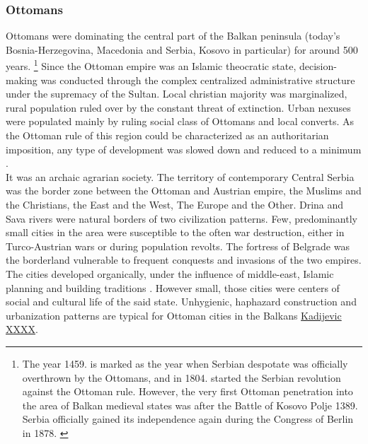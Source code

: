 \documentclass[11pt]{report}
\begin{document}
\subsubsection{Ottomans}

Ottomans were dominating the central part of the Balkan peninsula (today’s Bosnia-Herzegovina,  Macedonia  and  Serbia,  Kosovo  in  particular) for around 500 years.
\footnote{The year 1459. is marked as the year when Serbian despotate was officially overthrown by the Ottomans, and in 1804. started the Serbian revolution against the Ottoman rule. However, the very first Ottoman penetration into the area of Balkan medieval  states was after the Battle of Kosovo Polje 1389. Serbia officially gained its independence again during the Congress of Berlin in 1878. \href{ref}{\citealt{corovic_istorija_1997}}}
Since the Ottoman empire was an Islamic theocratic state, decision-making was conducted through the complex centralized administrative structure under the supremacy of the Sultan. Local christian majority was marginalized, rural population ruled over by the constant threat of extinction. Urban nexuses were populated mainly by ruling social class of Ottomans and local converts. As the Ottoman rule of this region could be characterized as an authoritarian imposition, any type of development was slowed down and reduced to a minimum \href{ref}{\citealt{nedovicbudic_waves_2006}}.
\\

It was an archaic agrarian society. The territory of contemporary Central Serbia was the border zone between the Ottoman and Austrian empire, the Muslims and the Christians, the East and the West, The Europe and the Other.
Drina and Sava rivers were natural borders of two civilization patterns. Few, predominantly small cities in the area were susceptible to the often war destruction, either in Turco-Austrian wars or during population revolts. The fortress of Belgrade was the borderland vulnerable to frequent conquests and invasions of the two empires. The cities developed organically, under the influence of middle-east, Islamic planning and building traditions \href{ref}{\citealt{naci ref ref from waves of planning 2006}}. However small, those cities were centers of social and cultural life of the said state. Unhygienic, haphazard construction and urbanization patterns are typical for Ottoman cities in the Balkans \href{ref}{Kadijevic XXXX}. 
\\ 
\end{document}
